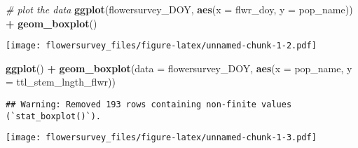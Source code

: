 \documentclass[
]{article}
\newenvironment{Shaded}{\begin{snugshade}}{\end{snugshade}}
\newcommand{\AttributeTok}[1]{\textcolor[rgb]{0.13,0.29,0.53}{#1}}
\newcommand{\CommentTok}[1]{\textcolor[rgb]{0.56,0.35,0.01}{\textit{#1}}}
\newcommand{\FunctionTok}[1]{\textcolor[rgb]{0.13,0.29,0.53}{\textbf{#1}}}
\newcommand{\NormalTok}[1]{#1}
\newcommand{\SpecialCharTok}[1]{\textcolor[rgb]{0.81,0.36,0.00}{\textbf{#1}}}
\begin{document}
\begin{Shaded}
\begin{Highlighting}[]
\CommentTok{\# plot the data}
\FunctionTok{ggplot}\NormalTok{(flowersurvey\_DOY, }\FunctionTok{aes}\NormalTok{(}\AttributeTok{x =}\NormalTok{ flwr\_doy, }\AttributeTok{y =}\NormalTok{ pop\_name)) }\SpecialCharTok{+}
  \FunctionTok{geom\_boxplot}\NormalTok{()}
\end{Highlighting}
\end{Shaded}

\texttt{[image: flowersurvey\_files/figure-latex/unnamed-chunk-1-2.pdf]}

\begin{Shaded}
\begin{Highlighting}[]
\FunctionTok{ggplot}\NormalTok{() }\SpecialCharTok{+}
  \FunctionTok{geom\_boxplot}\NormalTok{(}\AttributeTok{data =}\NormalTok{ flowersurvey\_DOY, }\FunctionTok{aes}\NormalTok{(}\AttributeTok{x =}\NormalTok{ pop\_name, }
                                           \AttributeTok{y =}\NormalTok{ ttl\_stem\_lngth\_flwr))}
\end{Highlighting}
\end{Shaded}

\begin{verbatim}
## Warning: Removed 193 rows containing non-finite values (`stat_boxplot()`).
\end{verbatim}

\texttt{[image: flowersurvey\_files/figure-latex/unnamed-chunk-1-3.pdf]}
\end{document}
